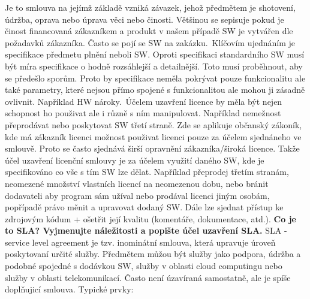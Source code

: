 \documentclass[12pt,a4paper,czech]{report}
\newcommand{\nadpis}[1]{\noindent\textbf{\Large{#1}}\normalsize}
\begin{document}
Je to smlouva na jejímž základě vzniká závazek, jehož předmětem je shotovení, údržba, oprava nebo úprava věci nebo činosti. Většinou se sepisuje pokud je činost financovaná zákazníkem a produkt v našem případě SW je vytvářen dle požadavků zákazníka. Často se pojí se SW na zakázku.\
Klíčovím ujednáním je specifikace předmetu plnění neboli SW. Oproti specifikaci standardního SW musí být míra specifikace o hodně rozsáhlejší a detailnější. Toto musí proběhnout, aby se předešlo sporům. Proto by specifikace neměla pokrývat pouze funkcionalitu ale také parametry, které nejsou přímo spojené s funkcionalitou ale mohou ji zásadně ovlivnit. Například HW nároky.\
Účelem uzavření licence by měla být nejen schopnost ho použivat ale i různě s ním manipulovat. Například nemežnost přeprodávat nebo poskytovat SW třetí straně. Zde se aplikuje občanský zákoník, kde má zákazník licenci možnost použivat licenci pouze za účelem sjednáneho ve smlouvě. Proto se často sjednává širší opravnění zákazníka/široká licence. Takže účel uzavření licenční smlouvy je za účelem využití daného SW, kde je specifikováno co vše s tím SW lze dělat. Například přeprodej třetím stranám, neomezené množství vlastních licencí na neomezenou dobu, nebo bránit dodavateli aby program sám užíval nebo prodával licenci jiným osobám, popřípadě právo měnit a upravovat dodaný SW. Dále lze sjednat přístup ke zdrojovým kódum + ošetřit její kvalitu (komentáře, dokumentace, atd.).
\newline
\newline
\nadpis{Co je to SLA? Vyjmenujte náležitosti a popište účel uzavření SLA.}
\newline
\newline
SLA - service level agreement je tzv. inominátní smlouva, která upravuje úroveň poskytovaní určité služby. Předmětem můžou být služby jako podpora, údržba a podobné spojedné s dodávkou SW, služby v oblasti cloud computingu nebo služby v oblasti telekomunikací. Často není úzavíraná samostatně, ale je spíše doplňujicí smlouva.
Typické prvky:
\end{document}
